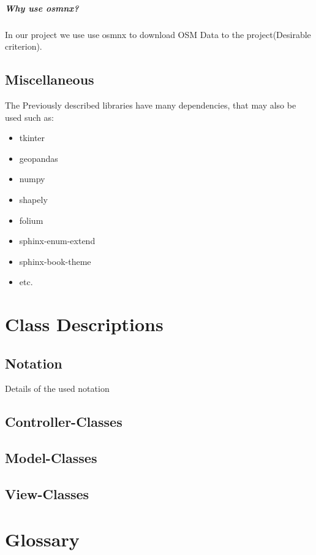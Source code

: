 \documentclass[parskip=full]{report} %
\begin{document}
\paragraph{Why use osmnx?}
In our project we use use osmnx to download OSM Data to the project(Desirable criterion).

\section{Miscellaneous}
The Previously described libraries have many dependencies, that may also be used such as:
\begin{itemize}
    \item tkinter
    \item geopandas
    \item numpy
    \item shapely
    \item folium
    \item sphinx-enum-extend
    \item sphinx-book-theme 
    \item etc.
\end{itemize}



\chapter{Class Descriptions} \label{sec::descriptions}
\section{Notation}
Details of the used notation

\section{Controller-Classes}

\section{Model-Classes}

\section{View-Classes}



\chapter{Glossary}
\end{document}
